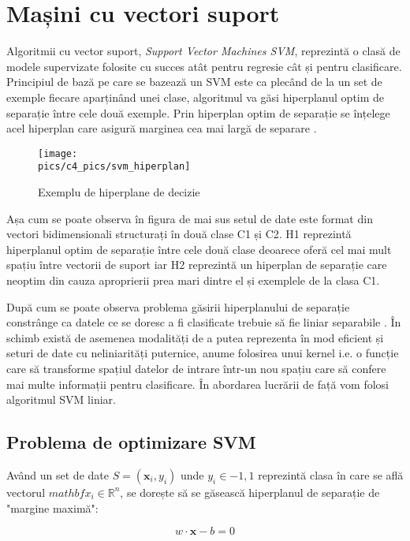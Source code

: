 \section{Mașini cu vectori suport}
Algoritmii cu vector suport, \textit{Support Vector Machines SVM}, reprezintă o clasă de modele supervizate folosite cu succes atât pentru regresie cât și pentru clasificare. Principiul de bază pe care se bazează un SVM este ca plecând de la un set de exemple fiecare aparținând unei clase, algoritmul va găsi hiperplanul optim de separație între cele două exemple. Prin hiperplan optim de separație se înțelege acel hiperplan care asigură marginea cea mai largă de separare \cite{svmbook}.

\begin{figure}[H]
\centering
\texttt{[image: \\pics/c4\_pics/svm\_hiperplan]}
\caption{Exemplu de hiperplane de decizie}
\label{fig:svm_hiper}
\end{figure}

Așa cum se poate observa în figura de mai sus setul de date este format din vectori bidimensionali structurați în două clase C1 și C2. H1 reprezintă hiperplanul optim de separație între cele două clase deoarece oferă cel mai mult spațiu între vectorii de suport iar H2 reprezintă un hiperplan de separație care neoptim din cauza aproprierii prea mari dintre el și exemplele de la clasa C1.

După cum se poate observa problema găsirii hiperplanului de separație constrânge ca datele ce se doresc a fi clasificate trebuie să fie liniar separabile \cite{svmbook}. În schimb există de asemenea modalități de a putea reprezenta în mod eficient și seturi de date cu neliniarități puternice, anume folosirea unui kernel i.e. o funcție care să transforme spațiul datelor de intrare într-un nou spațiu care să confere mai multe informații pentru clasificare. În abordarea lucrării de față vom folosi algoritmul SVM liniar.

\subsection{Problema de optimizare SVM}

Având un set de date $S={(\mathbf{x}_i, y_i)}$ unde $y_i \in {-1, 1}$ reprezintă clasa în care se află vectorul $mathbf{x}_i \in \mathbb{R}^n$, se dorește să se găsească hiperplanul de separație de 
"margine maximă":

\begin{equation}
    w \cdot \mathbf{x} - b = 0
\label{eq:svm_eq}
\end{equation}

